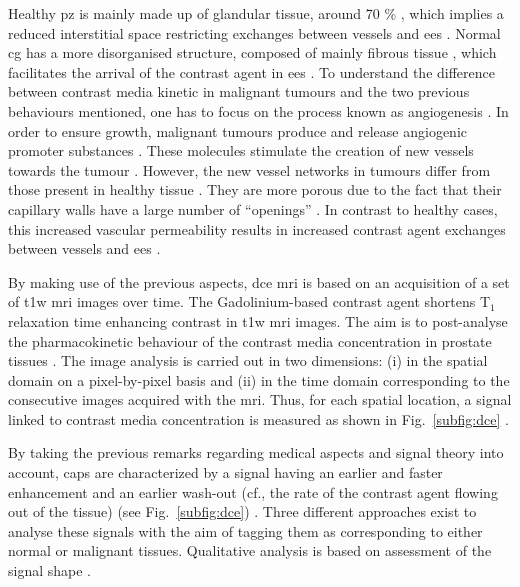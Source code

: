 Healthy \ac{pz} is mainly made up of glandular tissue, around 70 \% \cite{Choi2007}, which implies a reduced interstitial space restricting exchanges between vessels and \ac{ees} \cite{Buckley2004,Niekerk2009}.
Normal \ac{cg} has a more disorganised structure, composed of mainly fibrous tissue \cite{Choi2007,Hoeks2011}, which facilitates the arrival of the contrast agent in \ac{ees} \cite{Niekerk2013}.
To understand the difference between contrast media kinetic in malignant tumours and the two previous behaviours mentioned, one has to focus on the process known as angiogenesis \cite{Carmeliet2000}.
In order to ensure growth, malignant tumours produce and release angiogenic promoter substances \cite{Carmeliet2000}.
These molecules stimulate the creation of new vessels towards the tumour \cite{Carmeliet2000}.
However, the new vessel networks in tumours differ from those present in healthy tissue \cite{Gribbestad2005}.
They are more porous due to the fact that their capillary walls have a large number of ``openings'' \cite{Gribbestad2005,Choi2007}.
In contrast to healthy cases, this increased vascular permeability results in increased contrast agent exchanges between vessels and \ac{ees} \cite{Verma2012}.

By making use of the previous aspects, \ac{dce} \ac{mri} is based on an acquisition of a set of \ac{t1w} \ac{mri} images over time.
The Gadolinium-based contrast agent shortens T$_1$ relaxation time enhancing contrast in \ac{t1w} \ac{mri} images.
The aim is to post-analyse the pharmacokinetic behaviour of the contrast media concentration in prostate tissues \cite{Verma2012}.
The image analysis is carried out in two dimensions: (i) in the spatial domain on a pixel-by-pixel basis and (ii) in the time domain corresponding to the consecutive images acquired with the \ac{mri}.
Thus, for each spatial location, a signal linked to contrast media concentration is measured as shown in Fig.~\ref{subfig:dce} \cite{Tofts2010}. 

By taking the previous remarks regarding medical aspects and signal theory into account, \acp{cap} are characterized by a signal having an earlier and faster enhancement and an earlier wash-out (cf., the rate of the contrast agent flowing out of the tissue) (see Fig.~\ref{subfig:dce}) \cite{Verma2012}.
Three different approaches exist to analyse these signals with the aim of tagging them as corresponding to either normal or malignant tissues.
Qualitative analysis is based on assessment of the signal shape \cite{Hoeks2011}.

